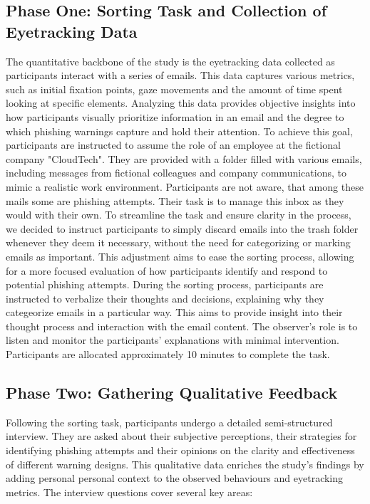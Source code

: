 \documentclass[
  a4paper,  %
  twoside,  %
  bibliography=totoc,
  headsepline,
  cleardoublepage=empty,
  parskip=half,
  draft=false
]{scrbook}
\begin{document}
\subsection{Phase One: Sorting Task and Collection of Eyetracking Data}

The quantitative backbone of the study is the eyetracking data collected as participants interact with a series of emails. This data captures various metrics, such as initial fixation points, gaze movements and the amount of time spent looking at specific elements. Analyzing this data provides objective insights into how participants visually prioritize information in an email and the degree to which phishing warnings capture and hold their attention. \newline
To achieve this goal, participants are instructed to assume the role of an employee at the fictional company "CloudTech". They are provided with a folder filled with various emails, including messages from fictional colleagues and company communications, to mimic a realistic work environment. Participants are not aware, that among these mails some are phishing attempts. Their task is to manage this inbox as they would with their own. To streamline the task and ensure clarity in the process, we decided to instruct participants to simply discard emails into the trash folder whenever they deem it necessary, without the need for categorizing or marking emails as important. This adjustment aims to ease the sorting process, allowing for a more focused evaluation of how participants identify and respond to potential phishing attempts. \newline During the sorting process, participants are instructed to verbalize their thoughts and decisions, explaining why they categeorize emails in a particular way. This aims to provide insight into their thought process and interaction with the email content. The observer's role is to listen and monitor the participants' explanations with minimal intervention. Participants are allocated approximately 10 minutes to complete the task. 

\subsection{Phase Two: Gathering Qualitative Feedback}

Following the sorting task, participants undergo a detailed semi-structured interview. They are asked about their subjective perceptions, their strategies for identifying phishing attempts and their opinions on the clarity and effectiveness of different warning designs.
This qualitative data enriches the study’s findings by adding personal personal context to the observed behaviours and eyetracking metrics. The interview questions cover several key areas:
\end{document}
